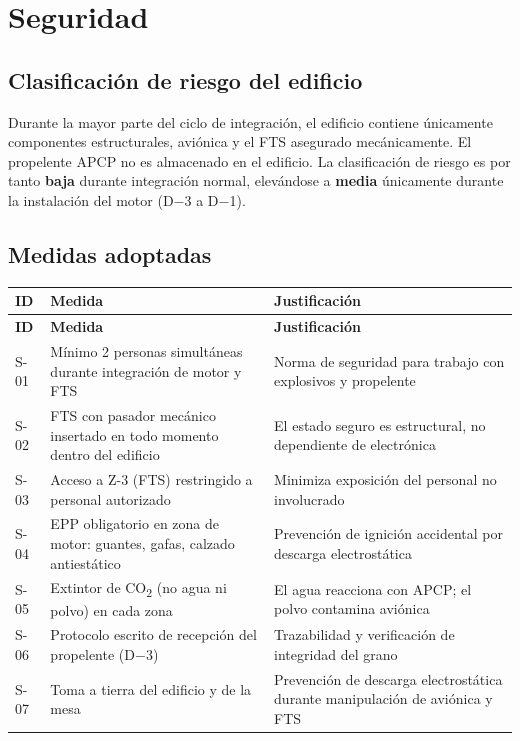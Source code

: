 \documentclass[11pt, a4paper]{article}
\begin{document}
\section{Seguridad}

\subsection{Clasificación de riesgo del edificio}

Durante la mayor parte del ciclo de integración, el edificio contiene únicamente componentes estructurales, aviónica y el FTS asegurado mecánicamente. El propelente APCP no es almacenado en el edificio. La clasificación de riesgo es por tanto \textbf{baja} durante integración normal, elevándose a \textbf{media} únicamente durante la instalación del motor (D$-$3 a D$-$1).

\subsection{Medidas adoptadas}

\begin{longtable}{C{1cm} L{5.5cm} L{7cm}}
  \color{white}\textbf{ID} &
  \color{white}\textbf{Medida} &
  \color{white}\textbf{Justificación} \\
  \endfirsthead
  \color{white}\textbf{ID} &
  \color{white}\textbf{Medida} &
  \color{white}\textbf{Justificación} \\
  \endhead
  S-01 & Mínimo 2 personas simultáneas durante integración de motor y FTS & Norma de seguridad para trabajo con explosivos y propelente \\
  S-02 & FTS con pasador mecánico insertado en todo momento dentro del edificio & El estado seguro es estructural, no dependiente de electrónica \\
  S-03 & Acceso a Z-3 (FTS) restringido a personal autorizado & Minimiza exposición del personal no involucrado \\
  S-04 & EPP obligatorio en zona de motor: guantes, gafas, calzado antiestático & Prevención de ignición accidental por descarga electrostática \\
  S-05 & Extintor de CO\textsubscript{2} (no agua ni polvo) en cada zona & El agua reacciona con APCP; el polvo contamina aviónica \\
  S-06 & Protocolo escrito de recepción del propelente (D$-$3) & Trazabilidad y verificación de integridad del grano \\
  S-07 & Toma a tierra del edificio y de la mesa & Prevención de descarga electrostática durante manipulación de aviónica y FTS \\
\end{longtable}
\end{document}
